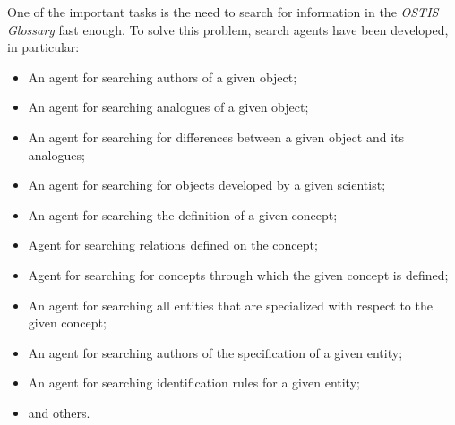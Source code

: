 \documentclass[12pt,a4paper]{scndocument}
\begin{document}
\begin{multicols}{2}
One of the important tasks is the need to search for information in the \textit{OSTIS Glossary} fast enough. To solve this problem, search agents have been developed, in particular:
\begin{itemize}
    \item An agent for searching authors of a given object;
    \item An agent for searching analogues of a given object;
    \item An agent for searching for differences between a given object and its analogues;
    \item An agent for searching for objects developed by a given scientist;
    \item An agent for searching the definition of a given concept;
    \item Agent for searching relations defined on the concept;
    \item Agent for searching for concepts through which the given concept is defined;
    \item An agent for searching all entities that are specialized with respect to the given concept;
    \item An agent for searching authors of the specification of a given entity;
    \item An agent for searching identification rules for a given entity;
    \item and others.
\end{itemize}




\end{multicols}
\end{document}
